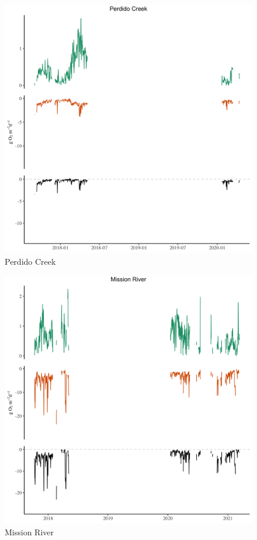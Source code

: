 \begin{figure}[htb]
\begin{center}
\includegraphics[scale=0.2]{Figs/PDC.png}
\caption{Perdido Creek}
\label{Fig:PDC}
\end{center}
\end{figure}

\begin{figure}[htb]
\begin{center}
\includegraphics[scale=0.2]{Figs/MR.png}
\caption{Mission River}
\label{Fig:MR}
\end{center}
\end{figure}

